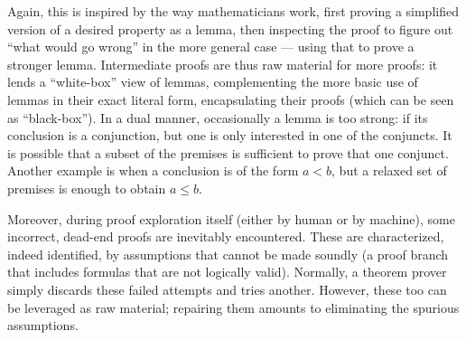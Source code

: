 Again, this is inspired by the way mathematicians work, first proving a
simplified version of a desired property as a lemma, then inspecting the proof
to figure out ``what would go wrong'' in the more general case --- using that
to prove a stronger lemma.
Intermediate proofs are thus raw material for more proofs: it lends a
``white-box'' view of lemmas, complementing the more basic use of lemmas in
their exact literal form, encapsulating their proofs (which can be seen as
``black-box'').
In a dual manner, occasionally a lemma is too strong: \eg if its conclusion is
a conjunction, but one is only interested in one of the conjuncts.
It is possible that a subset of the premises is sufficient to prove that one
conjunct.
Another example is when a conclusion is of the form $a < b$, but a relaxed set
of premises is enough to obtain $a \leq b$.

Moreover, during proof exploration itself (either by human or by machine), some
incorrect, dead-end proofs are inevitably encountered.
These are characterized, indeed identified, by assumptions that cannot be made
soundly (\eg a proof branch that includes formulas that are not logically valid).
Normally, a theorem prover simply discards these failed attempts and tries
another.
However, these too can be leveraged as raw material; repairing them amounts to
eliminating the spurious assumptions.
